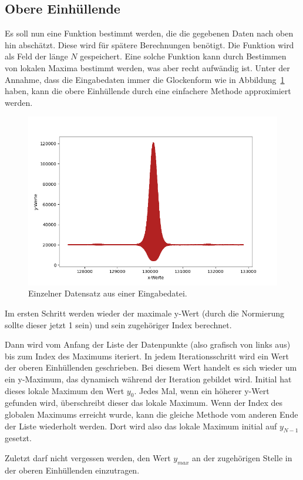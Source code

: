 \subsection{Obere Einhüllende}\label{subsec:ober-einh}
Es soll nun eine Funktion bestimmt werden, die die gegebenen Daten nach oben hin abschätzt.
Diese wird für spätere Berechnungen benötigt.
Die Funktion wird als Feld der länge $N$ gespeichert.
Eine solche Funktion kann durch Bestimmen von lokalen Maxima bestimmt werden, was aber recht aufwändig ist.
Unter der Annahme, dass die Eingabedaten immer die Glockenform wie in Abbildung~\ref{fig:eingabe-plot} haben, kann die obere Einhüllende durch eine einfachere Methode approximiert werden.
\begin{figure}[htb]
    \centering
    \includegraphics[width=0.8\linewidth]{images/EingabeInsgesamt}
    \caption{
        Einzelner Datensatz aus einer Eingabedatei.
    }
    \label{fig:eingabe-plot}
\end{figure}

Im ersten Schritt werden wieder der maximale y-Wert (durch die Normierung sollte dieser jetzt 1 sein) und sein zugehöriger Index berechnet.

Dann wird vom Anfang der Liste der Datenpunkte (also grafisch von links aus) bis zum Index des Maximums iteriert.
In jedem Iterationsschritt wird ein Wert der oberen Einhüllenden geschrieben.
Bei diesem Wert handelt es sich wieder um ein y-Maximum, das dynamisch während der Iteration gebildet wird.
Initial hat dieses lokale Maximum den Wert $y_0$.
Jedes Mal, wenn ein höherer y-Wert gefunden wird, überschreibt dieser das lokale Maximum.
Wenn der Index des globalen Maximums erreicht wurde, kann die gleiche Methode vom anderen Ende der Liste wiederholt werden.
Dort wird also das lokale Maximum initial auf $y_{N-1}$ gesetzt.

Zuletzt darf nicht vergessen werden, den Wert $y_{max}$ an der zugehörigen Stelle in der oberen Einhüllenden einzutragen.

